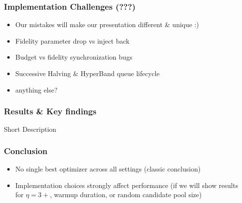\documentclass[t,english]{beamer}
\begin{document}
\begin{frame}
  \frametitle{Implementation Challenges (???)}

  \begin{itemize}[<+->]
    \item Our mistakes will make our presentation different \& unique :)
    \item Fidelity parameter drop vs inject back
    \item Budget vs fidelity synchronization bugs
    \item Successive Halving \& HyperBand queue lifecycle
    \item anything else?
    

  \end{itemize}

\end{frame}


\begin{frame}[fragile]
  \frametitle{Results \& Key findings}

  Short Description
\end{frame}





\begin{frame}
  \frametitle{Conclusion}

  \begin{itemize}[<+->]
    \item No single best optimizer across all settings (classic conclusion)
    \item Implementation choices strongly affect performance (if we will show results for $\eta = 3+$, warmup duration, or random candidate pool size)
  \end{itemize}

\end{frame}




%
\end{document}
